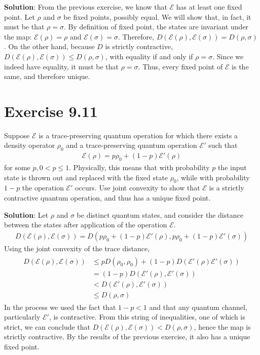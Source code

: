 \documentclass{book}
\newcommand{\mc}[1]{\mathcal{#1}}
\begin{document}
    \textbf{Solution}: From the previous exercise, we know that $\mc{E}$ has at least one fixed point. Let $\rho$ and $\sigma$ be fixed points, possibly equal. We will show that, in fact, it must be that $\rho = \sigma$. By definition of fixed point, the states are invariant under the map: $\mc{E}(\rho) = \rho$ and $\mc{E}(\sigma) = \sigma$. Therefore, $D(\mc{E}(\rho),\mc{E}(\sigma)) = D(\rho, \sigma)$. On the other hand, because $D$ is strictly contractive, $D(\mc{E}(\rho), \mc{E}(\sigma)) \leq D(\rho, \sigma)$, with equality if and only if $\rho = \sigma$. Since we indeed have equality, it must be that $\rho = \sigma$. Thus, every fixed point of $\mc{E}$ is the same, and therefore unique.

\section*{Exercise 9.11}
    Suppose $\mc{E}$ is a trace-preserving quantum operation for which there exists a density operator $\rho_0$ and a trace-preserving quantum operation $\mc{E}'$ such that
    \begin{align}
        \mc{E}(\rho) = p\rho_0 + (1-p)\mc{E}'(\rho)
    \end{align}
    for some $p, 0 < p \leq 1$. Physically, this means that with probability $p$ the input state is thrown out and replaced with the fixed state $\rho_0$, while with probability $1 - p$ the operation $\mc{E}'$ occurs. Use joint convexity to show that $\mc{E}$ is a strictly contractive quantum operation, and thus has a unique fixed point.
    
    \textbf{Solution}: Let $\rho$ and $\sigma$ be distinct quantum states, and consider the distance between the states after application of the operation $\mc{E}$.
    \begin{align}
        D(\mc{E}(\rho),\mc{E}(\sigma)) = D(p\rho_0 + (1-p)\mc{E}'(\rho), p \rho_0 + (1-p)\mc{E}'(\sigma))
    \end{align}
    Using the joint convexity of the trace distance,
    \begin{align}
    \begin{aligned}
        D(\mc{E}(\rho),\mc{E}(\sigma)) &\leq p D(\rho_0, \rho_0) + (1-p)D(\mc{E}'(\rho) \mc{E}'(\sigma)) \\
        &= (1-p) D(\mc{E}'(\rho), \mc{E}'(\sigma)) \\
        &< D(\mc{E}'(\rho), \mc{E}'(\sigma))\\
        &\leq D(\rho, \sigma)
    \end{aligned}
    \end{align}
    In the process we used the fact that $1-p <1$ and that any quantum channel, particularly $\mc{E}'$, is contractive. From this string of inequalities, one of which is strict, we can conclude that $D(\mc{E}(\rho), \mc{E}(\sigma)) < D(\rho, \sigma)$, hence the map is strictly contractive. By the results of the previous exercise, it also has a unique fixed point. 
    
\end{document}
